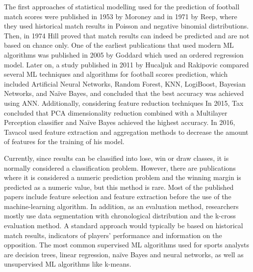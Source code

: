 \documentclass[8pt]{article}
\begin{document}
The first approaches of statistical modelling used for the prediction of football match scores were published in 1953 by Moroney \cite{moroney} 
and in 1971 by Reep,\cite{reep} 
where they used historical match results in Poisson and negative binomial distributions. Then, in 1974 Hill \cite{hill}
proved that match results can indeed be predicted and are not based on chance only. One of the earliest publications that used modern ML algorithms was published in 2005 by Goddard which used an ordered regression model.\cite{goddard}
 Later on, a study published in 2011 by Hucaljuk and Rakipovic compared several ML techniques and algorithms for football scores prediction, which included Artificial Neural Networks, Random Forest, KNN, LogiBoost, Bayesian Networks, and Naïve Bayes, and concluded that the best accuracy was achieved using ANN.\cite{hucaljuk} Additionally, considering feature reduction techniques In 2015, Tax concluded that PCA dimensionality reduction combined with a Multilayer Perception classifier and Naïve Bayes achieved the highest accuracy. \cite{dutch}
In 2016, Tavacol used feature extraction and aggregation methods to decrease the amount of features for the training of his model. \cite{tavakol}

Currently, since results can be classified into lose, win or draw classes, it is normally considered a classification problem. However, there are publications where it is considered a numeric prediction problem and the winning margin is predicted as a numeric value, but this method is rare. Most of the published papers include feature selection and feature extraction before the use of the machine-learning algorithm. In addition, as an evaluation method, researchers mostly use data segmentation  with chronological distribution and the k-cross evaluation method.\cite{anotherone} 
A standard approach would typically be based on historical match results, indicators of players' performance and information on the opposition. \cite{bunkerthabtah} The most common supervised ML algorithms used for sports analysts are decision trees, linear regression, naïve Bayes and neural networks, as well as unsupervised ML algorithms like k-means.
\end{document}
